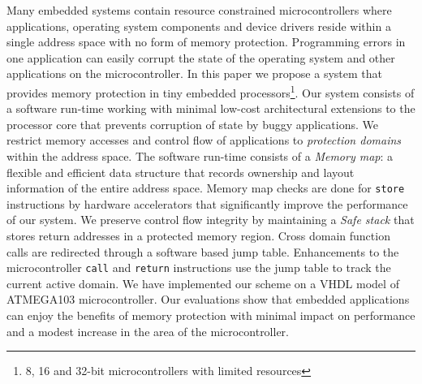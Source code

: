 \noindent
Many embedded systems contain resource constrained microcontrollers where applications, operating system components and device drivers reside within a single address space with no form of memory protection.
%
Programming errors in one application can easily corrupt the state of the operating system and other applications on the microcontroller.
%
In this paper we propose a system that provides memory protection in tiny embedded processors\footnote{8, 16 and 32-bit microcontrollers with limited resources}.
%
Our system consists of a software run-time working with minimal low-cost architectural extensions to the processor core that prevents corruption of state by buggy applications.
%
We restrict memory accesses and control flow of applications to \textit{protection domains} within the address space.
%
The software run-time consists of a \textit{Memory map}: a flexible and efficient data structure that records ownership and layout information of the entire address space.
%
Memory map checks are done for \texttt{store} instructions by hardware accelerators that significantly improve the performance of our system.
%
We preserve control flow integrity by maintaining a \textit{Safe stack} that stores return addresses in a protected memory region.
%
Cross domain function calls are redirected through a software based jump table.
%
Enhancements to the microcontroller \texttt{call} and \texttt{return} instructions use the jump table to track the current active domain.
%
We have implemented our scheme on a VHDL model of ATMEGA103 microcontroller.
%
Our evaluations show that embedded applications can enjoy the benefits of memory protection with minimal impact on performance and a modest increase in the area of the microcontroller.
